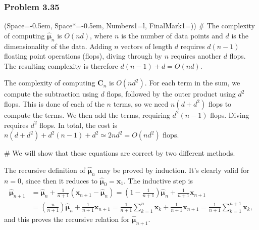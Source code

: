 \documentclass[12pt, a4paper]{article}
\newcommand{\listSpace}{-0.5em}%
\newcommand{\vect}[1]{\bm{#1}}
\begin{document}
\subsubsection*{Problem 3.35}
\begin{easylist}[enumerate]
	\ListProperties(Space=\listSpace, Space*=\listSpace, Numbers1=l, FinalMark1={)})
	# The complexity of computing $\hat{\vect{\mu}}_n$ is $O\left(nd\right)$, where $n$ is the number of data points and $d$ is the dimensionality of the data.
	Adding $n$ vectors of length $d$ requires $d(n-1)$ floating point operations (flops), diving through by $n$ requires another $d$ flops.
	The resulting complexity is therefore $d(n-1) + d = O(nd)$.
	
	The complexity of computing $\vect{C}_n$ is $O\left(nd^2\right)$.
	For each term in the sum, we compute the subtraction using $d$ flops, followed by the outer product using $d^2$ flops.
	This is done of each of the $n$ terms, so we need $n(d + d^2)$ flops to compute the terms.
	We then add the terms, requiring $d^2(n-1)$ flops.
	Diving requires $d^2$ flops.
	In total, the cost is $n(d + d^2) + d^2(n-1) + d^2 \simeq 2nd^2 = O(nd^2)$ flops.
	
	# We will show that these equations are correct by two different methods.
	
	
	The recursive definition of $\hat{\vect{\mu}}_n$ may be proved by induction.
	It's clearly valid for $n=0$, since then it reduces to $\hat{\vect{\mu}}_0 = \vect{x}_1$.
	The inductive step is
	\begin{align*}
	\hat{\vect{\mu}}_{n+1} &= \hat{\vect{\mu}}_{n} +  \frac{1}{n +1} \left( \vect{x}_{n+1} -  \hat{\vect{\mu}}_{n} \right)
	= 
	\left(1 - \frac{1}{n+1}\right) \hat{\vect{\mu}}_{n}  + \frac{1}{n + 1} \vect{x}_{n+1} \\
	&= 
	\left(\frac{n}{n+1}\right) \hat{\vect{\mu}}_{n}  + \frac{1}{n + 1} \vect{x}_{n+1} = 
	\frac{1}{n+1} \sum_{k=1}^{n} \vect{x}_{k} + \frac{1}{n+1} \vect{x}_{n+1}
	= \frac{1}{n+1} \sum_{k=1}^{n+1} \vect{x}_{k},
	\end{align*}
	and this proves the recursive relation for $\hat{\vect{\mu}}_{n+1}$.
	

\end{easylist}
\end{document}
